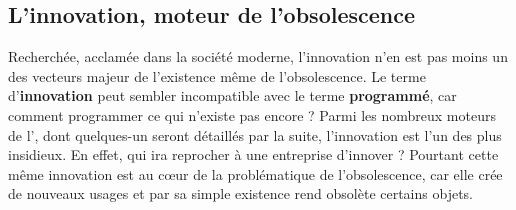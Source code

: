 \subsection{L'innovation, moteur de l'obsolescence}
Recherchée, acclamée dans la société moderne, l'innovation n'en est pas moins un des vecteurs majeur de l'existence même de l'obsolescence. Le terme d'\textbf{innovation} peut sembler incompatible avec le terme \textbf{programmé}, car comment programmer ce qui n'existe pas encore ?
\smallbreak
Parmi les nombreux moteurs de l'\op, dont quelques-un seront détaillés par la suite, l'innovation est l'un des plus insidieux. En effet, qui ira reprocher à une entreprise d'innover ? Pourtant cette même innovation est au cœur de la problématique de l'obsolescence, car elle crée de nouveaux usages et par sa simple existence rend obsolète certains objets.
